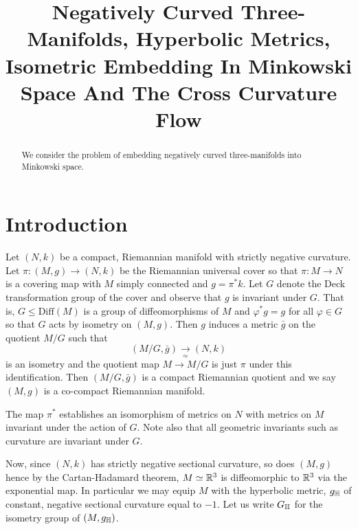 \documentclass[a4paper, 12pt]{amsart}
\begin{document}
\title[Negatively Curved Three Manifolds]{Negatively Curved Three-Manifolds, Hyperbolic Metrics, Isometric Embedding In Minkowski Space And The Cross Curvature Flow}

\date{}

\dedicatory{}

\begin{abstract}
We consider the problem of embedding negatively curved three-manifolds into Minkowski space.
\end{abstract}

\maketitle


\section{Introduction}
\label{sec:intro}

Let \((N, k)\) be a compact, Riemannian manifold with strictly negative curvature. Let \(\pi\colon (M, g) \to (N, k)\) be the Riemannian universal cover so that \(\pi : M \to N\) is a covering map with \(M\) simply connected and \(g = \pi^{\ast} k\). Let \(G\) denote the Deck transformation group of the cover and observe that \(g\) is invariant under \(G\). That is, \(G \leq \text{Diff}(M)\) is a group of diffeomorphisms of \(M\) and \(\varphi^{\ast} g = g\) for all \(\varphi \in G\) so that \(G\) acts by isometry on \((M, g)\). Then \(g\) induces a metric \(\bar{g}\) on the quotient \(M/G\) such that
\[
(M/G, \bar{g}) \underset{\simeq}{\to} (N, k)
\]
is an isometry and the quotient map \(M \to M/G\) is just \(\pi\) under this identification. Then \((M/G, \bar{g})\) is a compact Riemannian quotient and we say \((M, g)\) is a co-compact Riemannian manifold.
\begin{rem}
The map \(\pi^{\ast}\) establishes an isomorphism of metrics on \(N\) with metrics on \(M\) invariant under the action of \(G\). Note also that all geometric invariants such as curvature are invariant under \(G\).
\end{rem}
Now, since \((N, k)\) has strictly negative sectional curvature, so does \((M, g)\) hence by the Cartan-Hadamard theorem, \(M \simeq \mathbb{R}^3\) is diffeomorphic to \(\mathbb{R}^3\) via the exponential map. In particular we may equip \(M\) with the hyperbolic metric, \(g_{\mathbb{H}}\) of constant, negative sectional curvature equal to \(-1\). Let us write \(G_{\mathbb{H}}\) for the isometry group of \((M, g_{\mathbb{H}})\).
\end{document}
